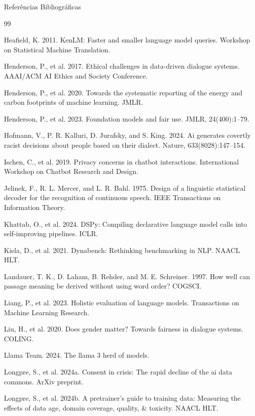 \documentclass[aspectratio=169]{beamer}
\begin{document}
\begin{frame}[allowframebreaks]{Referências Bibliográficas}
\begin{thebibliography}{99}
{     Heafield, K. 2011. KenLM: Faster and smaller language model queries. Workshop on Statistical Machine Translation.
    
     Henderson, P., et al. 2017. Ethical challenges in data-driven dialogue systems. AAAI/ACM AI Ethics and Society Conference.
    
     Henderson, P., et al. 2020. Towards the systematic reporting of the energy and carbon footprints of machine learning. JMLR.
    
     Henderson, P., et al. 2023. Foundation models and fair use. JMLR, 24(400):1–79.
    
     Hofmann, V., P. R. Kalluri, D. Jurafsky, and S. King. 2024. Ai generates covertly racist decisions about people based on their dialect. Nature, 633(8028):147–154.
    
     Ischen, C., et al. 2019. Privacy concerns in chatbot interactions. International Workshop on Chatbot Research and Design.
    
     Jelinek, F., R. L. Mercer, and L. R. Bahl. 1975. Design of a linguistic statistical decoder for the recognition of continuous speech. IEEE Transactions on Information Theory.
    
     Khattab, O., et al. 2024. DSPy: Compiling declarative language model calls into self-improving pipelines. ICLR.
    
     Kiela, D., et al. 2021. Dynabench: Rethinking benchmarking in NLP. NAACL HLT.
    
     Landauer, T. K., D. Laham, B. Rehder, and M. E. Schreiner. 1997. How well can passage meaning be derived without using word order? COGSCI.
    
     Liang, P., et al. 2023. Holistic evaluation of language models. Transactions on Machine Learning Research.
    
     Liu, H., et al. 2020. Does gender matter? Towards fairness in dialogue systems. COLING.
    
     Llama Team. 2024. The llama 3 herd of models.
    
     Longpre, S., et al. 2024a. Consent in crisis: The rapid decline of the ai data commons. ArXiv preprint.
    
     Longpre, S., et al. 2024b. A pretrainer’s guide to training data: Measuring the effects of data age, domain coverage, quality, \& toxicity. NAACL HLT.
    
}
\end{thebibliography}
\end{frame}
\end{document}
